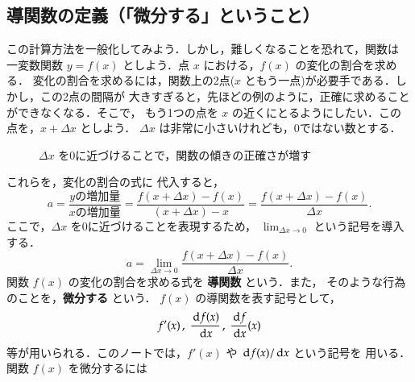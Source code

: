             \subsection{導関数の定義（「微分する」ということ）}
            この計算方法を一般化してみよう．しかし，難しくなることを恐れて，関数は
            一変数関数 $y=f(x)$ としよう．点 $x$ における，$f(x)$ の変化の割合を求める．
            変化の割合を求めるには，関数上の2点($x$ ともう一点)が必要手である．しかし，この2点の間隔が
            大きすぎると，先ほどの例のように，正確に求めることができなくなる．そこで，
            もう1つの点を $x$ の近くにとるようにしたい．この点を，$x+\Delta x$ としよう．
            $\Delta x$ は非常に小さいけれども，0ではない数とする．
                \begin{figure}[hbt]
                    \begin{center}
                        \caption{$\Delta x$ を0に近づけることで，関数の傾きの正確さが増す}
                        \label{fig:bibunn1}
                    \end{center}
                \end{figure}

            これらを，変化の割合の式に
            代入すると，
            \begin{equation*}
                a=\frac{y\mbox{の増加量}}{x\mbox{の増加量}}
                =\frac{f(x+\Delta x)-f(x)}{(x+\Delta x)-x}
                =\frac{f(x+\Delta x)-f(x)}{\Delta x}.
            \end{equation*}
            ここで，$\Delta x$ を0に近づけることを表現するため，
            $\displaystyle \lim_{\Delta x\rightarrow 0}$ という記号を導入する．
            \begin{equation*}
                a=\lim_{\Delta x\rightarrow 0}\frac{f(x+\Delta x)-f(x)}{\Delta x}.
            \end{equation*}
            関数 $f(x)$ の変化の割合を求める式を \textbf{導関数} という．また，
            そのような行為のことを，\textbf{微分する} という．
            $f(x)$ の導関数を表す記号として，
            \begin{align}
                f'(x)\,,\;\frac{\,\mathrm{d} f(x)}{\,\mathrm{d} x}\,,\;\frac{\,\mathrm{d} f}{\,\mathrm{d} x}(x)
            \end{align}
            等が用いられる．このノートでは，$f'(x)$ や $\,\mathrm{d} f(x)/\,\mathrm{d} x$ という記号を
            用いる．関数 $f(x)$ を微分するには\\

